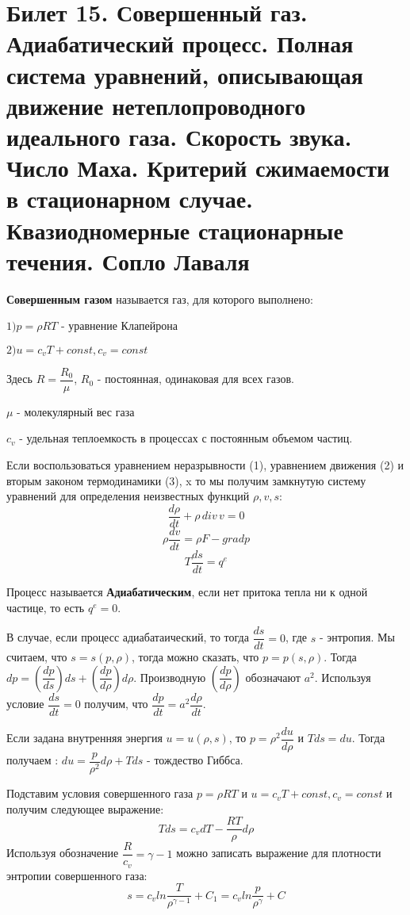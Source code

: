 \newpage
\section{Билет 15. Совершенный газ. Адиабатический процесс. Полная система уравнений, описывающая движение нетеплопроводного идеального газа. Скорость звука. Число Маха. Критерий сжимаемости в стационарном случае. Квазиодномерные стационарные течения. Сопло Лаваля}


\textbf{Совершенным газом} называется газ, для которого выполнено:

$1) p = \rho R T$ - уравнение Клапейрона

$2) u = c_v T + const, c_v = const$

Здесь $R = \dfrac{R_0}{\mu}$, $R_0$ - постоянная, одинаковая для всех газов.

$\mu$ - молекулярный вес газа

$c_v$ - удельная теплоемкость в процессах с постоянным объемом частиц.

Если воспользоваться уравнением неразрывности (1), уравнением движения (2) и вторым законом термодинамики (3),
x   то мы получим замкнутую систему уравнений для определения неизвестных функций $\rho, v, s$:
$$\dfrac{d \rho}{d t} + \rho \,div\, v = 0 $$
$$  \rho \dfrac{d v}{d t} = \rho F - grad p $$
$$ T \dfrac{d s}{d t} = q^{e}$$

Процесс называется \textbf{Адиабатическим}, если нет притока тепла ни к одной частице, то есть $q^{e} = 0$.

В случае, если процесс адиабатаический, то тогда $\dfrac{d s}{d t} = 0$, где $s$ - энтропия. Мы считаем, что $s = s(p,\rho)$, тогда можно сказать, что $p = p (s, \rho)$. Тогда $d p = \left(\dfrac{d p}{d s}\right)d s + \left(\dfrac{d p}{d \rho}\right) d \rho$. Производную $\left(\dfrac{d p}{d \rho}\right)$ обозначают $a^2$. Используя условие $\dfrac{d s}{d t} = 0$ получим, что $\dfrac{d p}{d t} = a^2 \dfrac{d \rho}{d t}$.

Если задана внутренняя энергия $u = u (\rho, s)$, то $p = \rho^2 \dfrac{d u}{d \rho}$ и $T d s = d u$. Тогда получаем : $d u = \dfrac{p}{\rho^2}d \rho + T d s$ - тождество Гиббса.

Подставим условия совершенного газа $ p = \rho R T$ и $u = c_v T + const, c_v = const$ и получим следующее выражение:
$$T d s = c_v d T - \dfrac{R T}{\rho}d \rho$$
Используя обозначение $\dfrac{R}{c_v} = \gamma - 1$ можно записать выражение для плотности энтропии совершенного газа:
$$s = c_vln\dfrac{T}{\rho^{\gamma-1}} + C_1 = c_v ln\dfrac{p}{\rho^\gamma} + C$$

